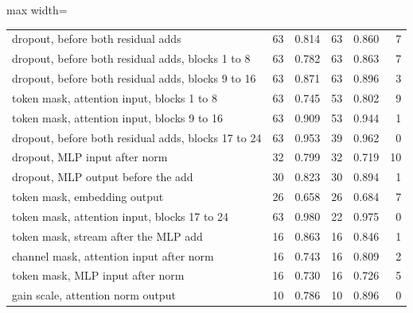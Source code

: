 \begin{table}[htbp]
\begin{adjustbox}{max width=\linewidth}
\begin{tabular}{lrrrrr}
dropout, before both residual adds & 63 & 0.814 & 63 & 0.860 & 7 \\
dropout, before both residual adds, blocks 1 to 8 & 63 & 0.782 & 63 & 0.863 & 7 \\
dropout, before both residual adds, blocks 9 to 16 & 63 & 0.871 & 63 & 0.896 & 3 \\
token mask, attention input, blocks 1 to 8 & 63 & 0.745 & 53 & 0.802 & 9 \\
token mask, attention input, blocks 9 to 16 & 63 & 0.909 & 53 & 0.944 & 1 \\
dropout, before both residual adds, blocks 17 to 24 & 63 & 0.953 & 39 & 0.962 & 0 \\
dropout, MLP input after norm & 32 & 0.799 & 32 & 0.719 & 10 \\
dropout, MLP output before the add & 30 & 0.823 & 30 & 0.894 & 1 \\
token mask, embedding output & 26 & 0.658 & 26 & 0.684 & 7 \\
token mask, attention input, blocks 17 to 24 & 63 & 0.980 & 22 & 0.975 & 0 \\
token mask, stream after the MLP add & 16 & 0.863 & 16 & 0.846 & 1 \\
channel mask, attention input after norm & 16 & 0.743 & 16 & 0.809 & 2 \\
token mask, MLP input after norm & 16 & 0.730 & 16 & 0.726 & 5 \\
gain scale, attention norm output & 10 & 0.786 & 10 & 0.896 & 0 \\
\bottomrule
\end{tabular}
\end{adjustbox}
\end{table}
